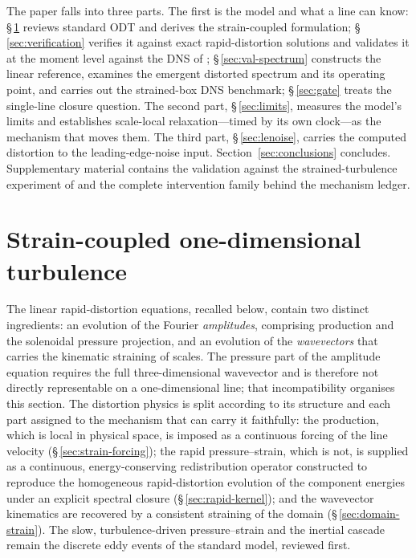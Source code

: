 \documentclass[lineno]{JFM-FLM_Au}
\begin{document}
The paper falls into three parts. The first is the model and what a
line can know: \S\,\ref{sec:formulation} reviews standard ODT and
derives the strain-coupled formulation; \S\,\ref{sec:verification}
verifies it against exact rapid-distortion solutions and validates it
at the moment level against the DNS of \citet{LeeReynolds1985};
\S\,\ref{sec:val-spectrum} constructs the linear reference, examines
the emergent distorted spectrum and its operating point, and carries
out the strained-box DNS benchmark; \S\,\ref{sec:gate} treats the
single-line closure question. The second part,
\S\,\ref{sec:limits}, measures the model's limits and establishes
scale-local relaxation---timed by its own clock---as the mechanism
that moves them. The third part, \S\,\ref{sec:lenoise}, carries the
computed distortion to the leading-edge-noise input.
Section~\ref{sec:conclusions} concludes. Supplementary material
contains the validation against the strained-turbulence experiment of
\citet{ChenMeneveauKatz2006} and the complete intervention family
behind the mechanism ledger.

\section{Strain-coupled one-dimensional turbulence}\label{sec:formulation}

The linear rapid-distortion equations, recalled below, contain two
distinct ingredients: an evolution of the Fourier \emph{amplitudes},
comprising production and the solenoidal pressure projection, and an
evolution of the \emph{wavevectors} that carries the kinematic straining
of scales. The pressure part of the amplitude equation requires the full
three-dimensional wavevector and is therefore not directly representable
on a one-dimensional line; that incompatibility organises this section.
The distortion physics is split according to its structure and each part
assigned to the mechanism that can carry it faithfully: the production,
which is local in physical space, is imposed as a continuous forcing of
the line velocity (\S\,\ref{sec:strain-forcing}); the rapid
pressure--strain, which is not, is supplied as a continuous,
energy-conserving redistribution operator constructed to reproduce the
homogeneous rapid-distortion evolution of the component energies under an
explicit spectral closure (\S\,\ref{sec:rapid-kernel}); and the wavevector
kinematics are recovered by a consistent straining of the domain
(\S\,\ref{sec:domain-strain}). The slow, turbulence-driven
pressure--strain and the inertial cascade remain the discrete eddy events
of the standard model, reviewed first.
\end{document}
